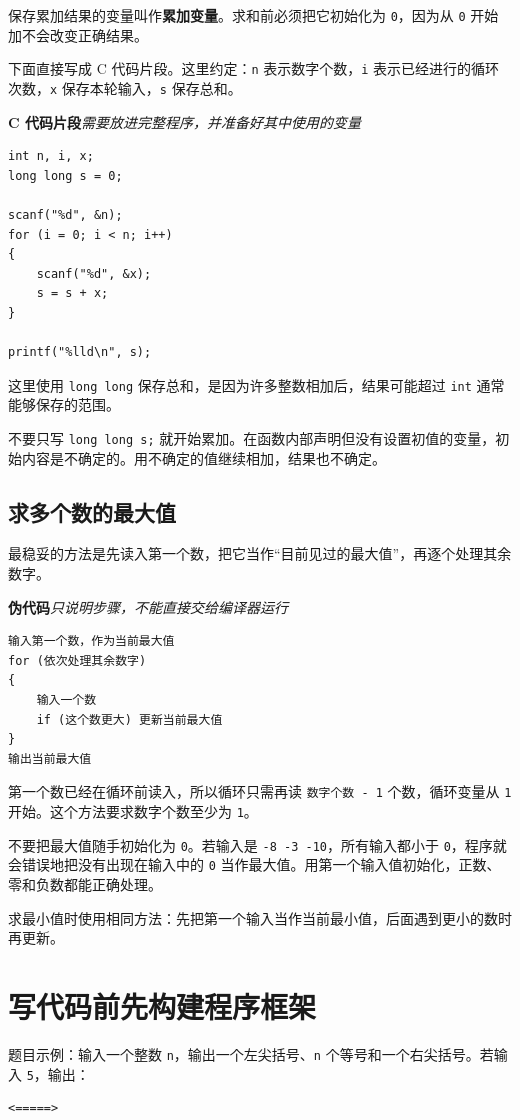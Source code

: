 \documentclass[UTF8,zihao=-4,fontset=windows]{ctexart}
\newcommand{\term}[1]{\textbf{\color{navy}#1}}
\newcommand{\pseudolabel}{\noindent\textbf{伪代码}\quad\textit{只说明步骤，不能直接交给编译器运行}\par\nopagebreak}
\newcommand{\cfragmentlabel}{\noindent\textbf{C 代码片段}\quad\textit{需要放进完整程序，并准备好其中使用的变量}\par\nopagebreak}
\begin{document}
保存累加结果的变量叫作\term{累加变量}。求和前必须把它初始化为 \verb|0|，因为从 \verb|0| 开始加不会改变正确结果。

下面直接写成 C 代码片段。这里约定：\verb|n| 表示数字个数，\verb|i| 表示已经进行的循环次数，\verb|x| 保存本轮输入，\verb|s| 保存总和。

\cfragmentlabel
\begin{lstlisting}[style=cstyle]
int n, i, x;
long long s = 0;

scanf("%d", &n);
for (i = 0; i < n; i++)
{
    scanf("%d", &x);
    s = s + x;
}

printf("%lld\n", s);
\end{lstlisting}

这里使用 \verb|long long| 保存总和，是因为许多整数相加后，结果可能超过 \verb|int| 通常能够保存的范围。

不要只写 \verb|long long s;| 就开始累加。在函数内部声明但没有设置初值的变量，初始内容是不确定的。用不确定的值继续相加，结果也不确定。

\subsection{求多个数的最大值}

最稳妥的方法是先读入第一个数，把它当作“目前见过的最大值”，再逐个处理其余数字。

\pseudolabel
\begin{lstlisting}[style=pseudostyle]
输入第一个数，作为当前最大值
for (依次处理其余数字)
{
    输入一个数
    if (这个数更大) 更新当前最大值
}
输出当前最大值
\end{lstlisting}

第一个数已经在循环前读入，所以循环只需再读 \verb|数字个数 - 1| 个数，循环变量从 \verb|1| 开始。这个方法要求数字个数至少为 \verb|1|。

不要把最大值随手初始化为 \verb|0|。若输入是 \verb|-8 -3 -10|，所有输入都小于 \verb|0|，程序就会错误地把没有出现在输入中的 \verb|0| 当作最大值。用第一个输入值初始化，正数、零和负数都能正确处理。

求最小值时使用相同方法：先把第一个输入当作当前最小值，后面遇到更小的数时再更新。

\section{写代码前先构建程序框架}

题目示例：输入一个整数 \verb|n|，输出一个左尖括号、\verb|n| 个等号和一个右尖括号。若输入 \verb|5|，输出：
\begin{verbatim}
<=====>
\end{verbatim}
\end{document}
